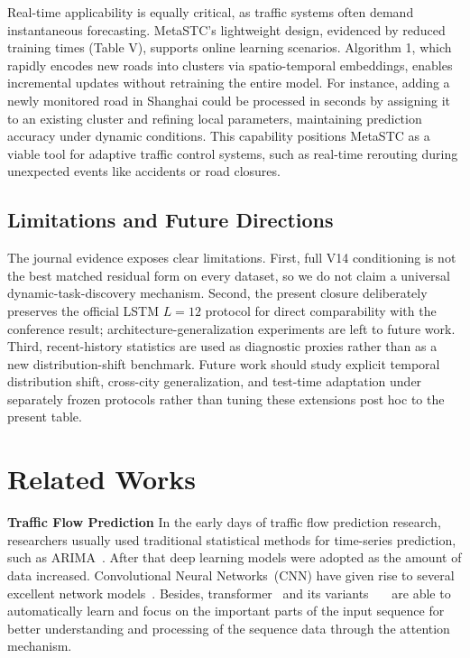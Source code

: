 \documentclass[lettersize,journal]{IEEEtran}
\begin{document}
Real-time applicability is equally critical, as traffic systems often demand instantaneous forecasting. MetaSTC’s lightweight design, evidenced by reduced training times (Table V), supports online learning scenarios. Algorithm 1, which rapidly encodes new roads into clusters via spatio-temporal embeddings, enables incremental updates without retraining the entire model. For instance, adding a newly monitored road in Shanghai could be processed in seconds by assigning it to an existing cluster and refining local parameters, maintaining prediction accuracy under dynamic conditions. This capability positions MetaSTC as a viable tool for adaptive traffic control systems, such as real-time rerouting during unexpected events like accidents or road closures.

\subsection{Limitations and Future Directions}
The journal evidence exposes clear limitations. First, full V14 conditioning is not the best matched residual form on every dataset, so we do not claim a universal dynamic-task-discovery mechanism. Second, the present closure deliberately preserves the official LSTM $L=12$ protocol for direct comparability with the conference result; architecture-generalization experiments are left to future work. Third, recent-history statistics are used as diagnostic proxies rather than as a new distribution-shift benchmark. Future work should study explicit temporal distribution shift, cross-city generalization, and test-time adaptation under separately frozen protocols rather than tuning these extensions post hoc to the present table.

\section{Related Works}

\textbf{Traffic Flow Prediction}
In the early days of traffic flow prediction research, researchers usually used traditional statistical methods for time-series prediction, such as ARIMA~\cite{arima}. After that deep learning models were adopted as the amount of data increased. Convolutional Neural Networks~(CNN) have given rise to several excellent network models~\cite{DBLP:conf/iclr/WuHLZ0L23}. Besides, transformer~\cite{DBLP:conf/nips/VaswaniSPUJGKP17} and its variants~\cite{nips/LiJXZCWY19}~\cite{DBLP:conf/pkdd/FanYCWZWDZZ23}~\cite{DBLP:conf/aaai/JiangHZW23} are able to automatically learn and focus on the important parts of the input sequence for better understanding and processing of the sequence data through the attention mechanism. 
\end{document}
